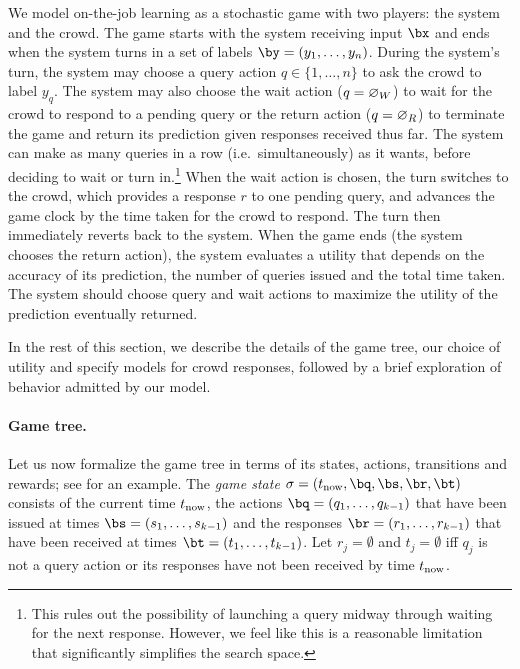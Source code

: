 We model on-the-job learning as a stochastic game with two players: the system and the crowd.
The game starts with the system receiving input $\bx$ and ends when the system turns in a set of labels $\by = (y_1, \ldots, y_n)$. 
During the system's turn, the system may choose a query action $q \in \{1, \ldots, n\}$ to ask the crowd to label $y_q$. 
The system may also choose 
the wait action ($q = \varnothing_{W}$) to wait for the crowd to respond to a pending query
or
the return action ($q = \varnothing_{R}$) to terminate the game and return its prediction given responses received thus far.
The system can make as many queries in a row (i.e.\ simultaneously) as it wants, before deciding to wait or turn in.\footnote{
This rules out the possibility
of launching a query midway through waiting for the next response. However, we
feel like this is a reasonable limitation that significantly simplifies the
search space.
}
When the wait action is chosen, the turn switches to the crowd, which provides a response $r$ to one pending query, and advances the game clock by the time taken for the crowd to respond.
The turn then immediately reverts back to the system.
When the game ends (the system chooses the return action), the system evaluates a utility that depends on the accuracy of its prediction,
the number of queries issued and the total time taken.
The system should choose query and wait actions to
maximize the utility of the prediction eventually returned.

In the rest of this section, we describe the details of the game tree, our choice of utility and specify models for crowd responses, followed by a brief exploration of behavior admitted by our model.

\paragraph{Game tree.}
Let us now formalize the game tree in terms of its states, actions, transitions and rewards; see  for an example. 
The \emph{game state} $\sigma = (\now, \bq, \bs, \br, \bt)$
consists of the current time $t_\text{now}$, the actions $\bq = (q_1, \ldots, q_{k-1})$ that have been issued at times $\bs = (s_1, \ldots, s_{k-1})$ and
the responses $\br = (r_1, \ldots, r_{k-1})$ that have been received at times $\bt = (t_1, \ldots, t_{k-1})$.
Let $r_j = \emptyset$ and $t_j = \emptyset$ iff
$q_j$ is not a query action or
its responses have not been received by time $t_\text{now}$.

